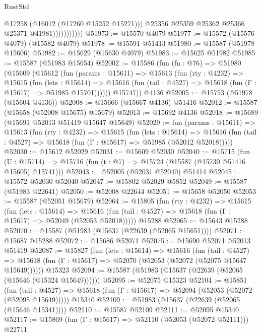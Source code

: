 \begin{lexlean}{RustStd}
\begin{coremodule}
                            @17258
                            (@16012 (@17260 @15252 @15271)))
                          @25356
                          @25359
                          @25362
                          @25366
                          @25371
                          @41981)))))))))))
@51973 := @15570 @4079
@51977 := @15572 (@15576 @4079) (@15582 @4079)
@51978 := @15591 @51413
@51980 := @15587 (@51978 @15606)
@51982 := @15629 (@15630 @4079)
@51983 := @15625 @51982
@51985 := @15587 (@51983 @15654)
@52002 := @15586
    (fun (fn : @76) =>
    @51980
      (@15609
        (@15612
          (fun (params : @15611) =>
          @15613
            (fun (rty : @4232) =>
            @15615
              (fun (lets : @15614) =>
              @15616 (fun (tail : @4527) => @15618 (fun (Γ : @15617) => @51985 @15701))))))
        @15747))
    @4136
@52005 := @15753 (@51978 (@15604 @4136))
@52008 := @15666 (@15667 @4136) @51416
@52012 := @15587 (@15658 (@52008 @15675) @15679)
@52013 := @15692 @4136
@52018 := @15689 (@15691 @52013 @51419 @15647 @15649)
@52029 := fun (params : @15611) =>
  @15613
    (fun (rty : @4232) =>
    @15615
      (fun (lets : @15614) =>
      @15616 (fun (tail : @4527) => @15618 (fun (Γ : @15617) => @51985 (@52012 @52018)))))
@52030 := @15612 @52029
@52031 := @15609 @52030
@52040 := @15715
    (fun (U : @15714) => @15716 (fun (t : @7) => @15724 (@15587 (@15730 @51416 @15605) @15741)))
@52043 := @52005 (@52031 @52040) @51414
@52045 := @15572 @52030 @52040
@52047 := @15802 @52029 @5852
@52049 := @15587 (@51983 @22641)
@52050 := @52008 @22644
@52051 := @15658 @52050
@52053 := @15587 (@52051 @15679)
@52064 := @15805
    (fun (rty : @4232) =>
    @15615
      (fun (lets : @15614) =>
      @15616 (fun (tail : @4527) => @15618 (fun (Γ : @15617) => @52049 (@52053 @52018)))))
    @15288
@52065 := @15643 @15288
@52070 := @15587 (@51983 (@15637 (@22639 (@52065 @15651))))
@52071 := @15687 @15288
@52072 := @15686 @52071
@52075 := @15690 @52071 @52013 @51419
@52087 := @15827
    (fun (lets : @15614) =>
    @15616
      (fun (tail : @4527) =>
      @15618 (fun (Γ : @15617) => @52070 (@52053 (@52072 (@52075 @15647 @15649))))))
    @15323
@52094 := @15587 (@51983 (@15637 (@22639 (@52065 (@15646 (@15324 @15649))))))
@52095 := @52075 @15323
@52104 := @15851
    (fun (tail : @4527) => @15618 (fun (Γ : @15617) => @52094 (@52053 (@52072 (@52095 @15649)))))
    @15340
@52109 := @51983 (@15637 (@22639 (@52065 (@15646 @15341))))
@52110 := @15587 @52109
@52111 := @52095 @15340
@52117 := @15869 (fun (Γ : @15617) => @52110 (@52053 (@52072 @52111))) @22711

\end{coremodule}
\end{lexlean}
